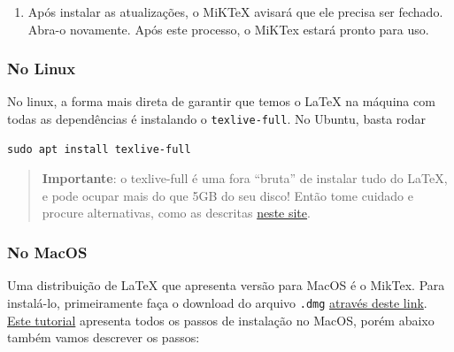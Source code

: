 \documentclass[
]{book}
\providecommand{\tightlist}{%
  \setlength{\itemsep}{0pt}\setlength{\parskip}{0pt}}
\begin{document}
\begin{enumerate}
\def\labelenumi{\arabic{enumi}.}
\setcounter{enumi}{10}
\tightlist
\item
  Após instalar as atualizações, o MiKTeX avisará que ele precisa ser fechado. Abra-o novamente. Após este processo, o MiKTex estará pronto para uso.
\end{enumerate}

\hypertarget{no-linux-1}{%
\subsubsection{No Linux}\label{no-linux-1}}

No linux, a forma mais direta de garantir que temos o LaTeX na máquina com todas as dependências é instalando o \texttt{texlive-full}. No Ubuntu, basta rodar

\begin{verbatim}
sudo apt install texlive-full
\end{verbatim}

\begin{quote}
\textbf{Importante}: o texlive-full é uma fora ``bruta'' de instalar tudo do LaTeX, e pode ocupar mais do que 5GB do seu disco! Então tome cuidado e procure alternativas, como as descritas \href{https://linuxconfig.org/how-to-install-latex-on-ubuntu-18-04-bionic-beaver-linux}{neste site}.
\end{quote}

\hypertarget{no-macos-1}{%
\subsubsection{No MacOS}\label{no-macos-1}}

Uma distribuição de LaTeX que apresenta versão para MacOS é o MikTex. Para instalá-lo, primeiramente faça o download do arquivo \texttt{.dmg} \href{https://miktex.org/download\#mac}{através deste link}. \href{https://miktex.org/howto/install-miktex-mac}{Este tutorial} apresenta todos os passos de instalação no MacOS, porém abaixo também vamos descrever os passos:
\end{document}
